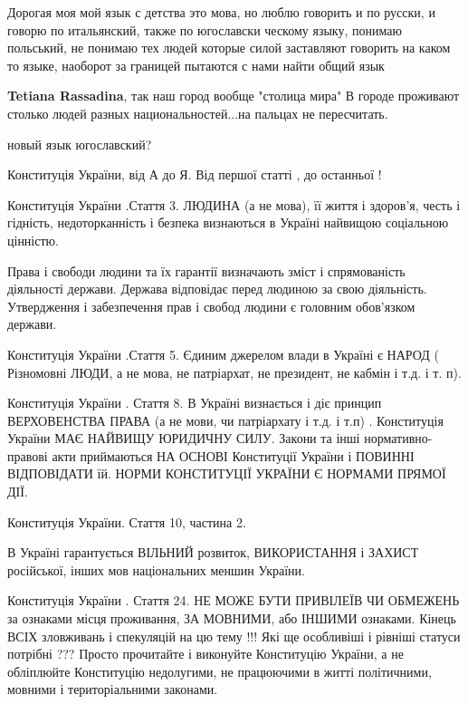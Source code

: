 \begin{itemize}
Дорогая моя мой язык с детства это мова, но люблю говорить и по русски, и
говорю по итальянский, также по югославски ческому языку, понимаю польський, не
понимаю тех людей которые силой заставляют говорить на каком то языке, наоборот
за границей пытаются с нами найти общий язык

\begin{itemize}

\textbf{Tetiana Rassadina}, так наш город вообще "столица мира" В городе проживают столько людей разных национальностей...на пальцах не пересчитать.

новый язык югославский?
\end{itemize}



Конституція України, від А до Я. Від першої статті , до останньої !

Конституція України .Стаття 3. ЛЮДИНА (а не мова), її життя і здоров'я, честь і
гідність, недоторканність і безпека визнаються в Україні найвищою соціальною
цінністю.

Права і свободи людини та їх гарантії визначають зміст і спрямованість
діяльності держави. Держава відповідає перед людиною за свою діяльність.
Утвердження і забезпечення прав і свобод людини є головним обов'язком держави.

Конституція України .Стаття 5. Єдиним джерелом влади в Україні є НАРОД (
Різномовні ЛЮДИ, а не мова, не патріархат, не президент, не кабмін і т.д. і т.
п).

Конституція України . Стаття 8. В Україні визнається і діє принцип ВЕРХОВЕНСТВА
ПРАВА (а не мови, чи патріархату і т.д. і т.п) . Конституція України МАЄ
НАЙВИЩУ ЮРИДИЧНУ СИЛУ. Закони та інші нормативно-правові акти приймаються НА
ОСНОВІ Конституції України і ПОВИННІ ВІДПОВІДАТИ їй. НОРМИ КОНСТИТУЦІЇ УКРАЇНИ
Є НОРМАМИ ПРЯМОЇ ДІЇ.

Конституція України. Стаття 10, частина 2.

В Україні гарантується ВІЛЬНИЙ розвиток, ВИКОРИСТАННЯ і ЗАХИСТ російської, інших мов національних меншин України.

Конституція України . Стаття 24. НЕ МОЖЕ БУТИ ПРИВІЛЕЇВ ЧИ ОБМЕЖЕНЬ за ознаками
місця проживання, ЗА МОВНИМИ, або ІНШИМИ ознаками. Кінець ВСІХ зловживань і
спекуляцій на цю тему !!! Які ще особливіші і рівніші статуси потрібні ???
Просто прочитайте і виконуйте Конституцію України, а не обліплюйте Конституцію
недолугими, не працюючими в житті політичними, мовними і територіальними
законами.


\end{itemize}

